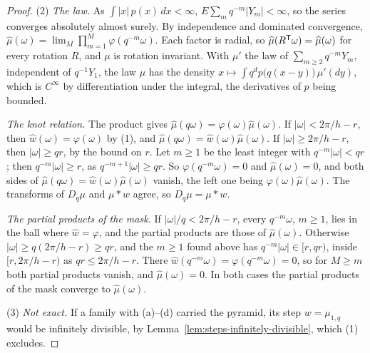 \begin{proof}
(2) \emph{The law.} As $\int|x|\,p(x)\,dx < \infty$, $E\sum_mq^{-m}|Y_m| < \infty$, so the series
converges absolutely almost surely. By independence and dominated convergence,
$\widehat\mu(\omega) = \lim_M\prod_{m=1}^M\varphi(q^{-m}\omega)$. Each factor is radial, so
$\widehat\mu(R^{\mathsf{T}}\omega) = \widehat\mu(\omega)$ for every rotation $R$, and $\mu$ is rotation
invariant. With $\mu'$ the law of $\sum_{m \ge 2}q^{-m}Y_m$, independent of $q^{-1}Y_1$, the law
$\mu$ has the density $x \mapsto \int q^dp\bigl(q(x - y)\bigr)\,\mu'(dy)$, which is $C^\infty$ by
differentiation under the integral, the derivatives of $p$ being bounded.

\emph{The knot relation.} The product gives $\widehat\mu(q\omega) = \varphi(\omega)\widehat\mu(\omega)$.
If $|\omega| < 2\pi/h - r$, then $\widehat w(\omega) = \varphi(\omega)$ by (1), and
$\widehat\mu(q\omega) = \widehat w(\omega)\widehat\mu(\omega)$. If $|\omega| \ge 2\pi/h - r$, then
$|\omega| \ge qr$, by the bound on $r$. Let $m \ge 1$ be the least integer with
$q^{-m}|\omega| < qr$; then $q^{-m}|\omega| \ge r$, as $q^{-m+1}|\omega| \ge qr$. So
$\varphi(q^{-m}\omega) = 0$ and $\widehat\mu(\omega) = 0$, and both sides of
$\widehat\mu(q\omega) = \widehat w(\omega)\widehat\mu(\omega)$ vanish, the left one being
$\varphi(\omega)\widehat\mu(\omega)$. The transforms of $D_q\mu$ and $\mu * w$ agree, so
$D_q\mu = \mu * w$.

\emph{The partial products of the mask.} If $|\omega|/q < 2\pi/h - r$, every $q^{-m}\omega$,
$m \ge 1$, lies in the ball where $\widehat w = \varphi$, and the partial products are those of
$\widehat\mu(\omega)$. Otherwise $|\omega| \ge q(2\pi/h - r) \ge qr$, and the $m \ge 1$ found above
has $q^{-m}|\omega| \in [r, qr)$, inside $[r, 2\pi/h - r)$ as $qr \le 2\pi/h - r$. There
$\widehat w(q^{-m}\omega) = \varphi(q^{-m}\omega) = 0$, so for $M \ge m$ both partial products
vanish, and $\widehat\mu(\omega) = 0$. In both cases the partial products of the mask converge to
$\widehat\mu(\omega)$.

(3) \emph{Not exact.} If a family with (a)--(d) carried the pyramid, its step $w = \mu_{1,q}$ would
be infinitely divisible, by Lemma~\ref{lem:steps-infinitely-divisible}, which (1) excludes.


\end{proof}
